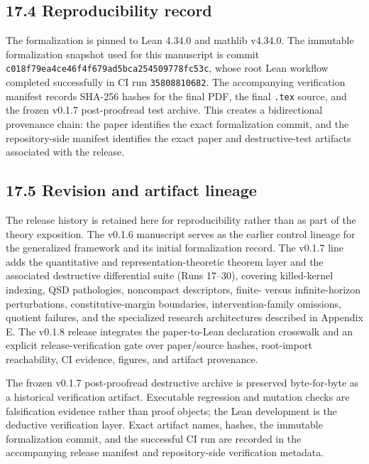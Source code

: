 \documentclass[10pt]{article}
\newcommand{\LeanSnapshotCommit}{c018f79ea4ce46f4f679ad5bca254509778fc53c}
\newcommand{\LeanCIRun}{35808810682}
\begin{document}
\subsection{17.4 Reproducibility record}\label{formal-reproducibility-record}

The formalization is pinned to Lean 4.34.0 and mathlib v4.34.0. The immutable formalization snapshot used for this manuscript is commit \nolinkurl{\LeanSnapshotCommit}, whose root Lean workflow completed successfully in CI run \texttt{\LeanCIRun}. The accompanying verification manifest records SHA-256 hashes for the final PDF, the final \texttt{.tex} source, and the frozen v0.1.7 post-proofread test archive. This creates a bidirectional provenance chain: the paper identifies the exact formalization commit, and the repository-side manifest identifies the exact paper and destructive-test artifacts associated with the release.

\subsection{17.5 Revision and artifact lineage}\label{revision-artifact-lineage}

The release history is retained here for reproducibility rather than as part of the theory exposition. The v0.1.6 manuscript serves as the earlier control lineage for the generalized framework and its initial formalization record. The v0.1.7 line adds the quantitative and representation-theoretic theorem layer and the associated destructive differential suite (Runs 17--30), covering killed-kernel indexing, QSD pathologies, noncompact descriptors, finite- versus infinite-horizon perturbations, constitutive-margin boundaries, intervention-family omissions, quotient failures, and the specialized research architectures described in Appendix E. The v0.1.8 release integrates the paper-to-Lean declaration crosswalk and an explicit release-verification gate over paper/source hashes, root-import reachability, CI evidence, figures, and artifact provenance.

The frozen v0.1.7 post-proofread destructive archive is preserved byte-for-byte as a historical verification artifact. Executable regression and mutation checks are falsification evidence rather than proof objects; the Lean development is the deductive verification layer. Exact artifact names, hashes, the immutable formalization commit, and the successful CI run are recorded in the accompanying release manifest and repository-side verification metadata.
\end{document}
